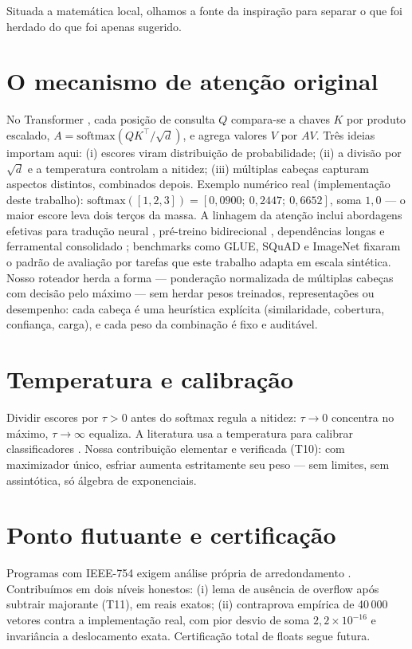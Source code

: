 Situada a matemática local, olhamos a fonte da inspiração para separar o que foi herdado do que foi apenas sugerido.
\section{O mecanismo de atenção original}
No Transformer \cite{vaswani2017}, cada posição de consulta $Q$ compara-se a chaves $K$ por produto escalado, $A=\mathrm{softmax}(QK^\top/\sqrt{d})$, e agrega valores $V$ por $AV$. Três ideias importam aqui: (i) escores viram distribuição de probabilidade; (ii) a divisão por $\sqrt{d}$ e a temperatura controlam a nitidez; (iii) múltiplas cabeças capturam aspectos distintos, combinados depois. Exemplo numérico real (implementação deste trabalho): $\mathrm{softmax}([1,2,3])=[0{,}0900;\ 0{,}2447;\ 0{,}6652]$, soma $1{,}0$ --- o maior escore leva dois terços da massa. A linhagem da atenção inclui abordagens efetivas para tradução neural \cite{luong2015}, pré-treino bidirecional \cite{devlin2019}, dependências longas \cite{dai2019} e ferramental consolidado \cite{wolf2020}; benchmarks como GLUE, SQuAD e ImageNet \cite{wang2018,rajpurkar2016,deng2009} fixaram o padrão de avaliação por tarefas que este trabalho adapta em escala sintética. Nosso roteador herda a forma --- ponderação normalizada de múltiplas cabeças com decisão pelo máximo --- sem herdar pesos treinados, representações ou desempenho: cada cabeça é uma heurística explícita (similaridade, cobertura, confiança, carga), e cada peso da combinação é fixo e auditável.
\section{Temperatura e calibração}
Dividir escores por $\tau>0$ antes do softmax regula a nitidez: $\tau\to0$ concentra no máximo, $\tau\to\infty$ equaliza. A literatura usa a temperatura para calibrar classificadores \cite{komisarenko2024,xuan2025,xie2024}. Nossa contribuição elementar e verificada (T10): com maximizador único, esfriar aumenta estritamente seu peso --- sem limites, sem assintótica, só álgebra de exponenciais.
\section{Ponto flutuante e certificação}
Programas com IEEE-754 exigem análise própria de arredondamento \cite{bagnara2019,murray2026}. Contribuímos em dois níveis honestos: (i) lema de ausência de overflow após subtrair majorante (T11), em reais exatos; (ii) contraprova empírica de 40\,000 vetores contra a implementação real, com pior desvio de soma $2{,}2\times10^{-16}$ e invariância a deslocamento exata. Certificação total de floats segue futura.
